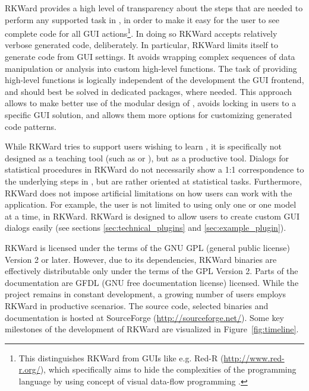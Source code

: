 RKWard provides a high level of transparency about the steps that are needed to
perform any supported task in , in order to make it easy for the user to see
complete code for all GUI actions\footnote{
  This distinguishes RKWard from  GUIs like e.g. Red-R (\url{http://www.red-r.org/}), which 
  specifically aims to hide the complexities of the  programming language by using concept of visual data-flow
  programming \citep{Sutherland1966}.
}. In doing so RKWard accepts relatively verbose
generated code, deliberately. In particular, RKWard limits itself to generate 
code from GUI settings. It avoids wrapping complex sequences of data
manipulation or analysis into custom high-level  functions. The task of
providing high-level functions is logically independent of the development the
GUI frontend, and should best be solved in dedicated  packages, where needed.
This approach allows to make better use of the modular design of , avoids
locking in users to a specific GUI solution, and allows them more options for
customizing generated code patterns.

While RKWard tries to support users wishing to learn , it is specifically not
designed as a teaching tool (such as  or ), but as
a productive tool. Dialogs for statistical procedures in RKWard do not
necessarily show a 1:1 correspondence to the underlying steps in , but are
rather oriented at statistical tasks. Furthermore, RKWard does not impose
artificial limitations on how users can work with the application. For example,
the user is not limited to using only one  or one model at a
time, in RKWard. RKWard is designed to allow users to create custom GUI dialogs
easily (see sections \ref{sec:technical_plugins} and \ref{sec:example_plugin}).

RKWard is licensed under the terms of the GNU GPL (general public license) Version 2
or later. However, due to its dependencies, RKWard binaries are effectively
distributable only under the terms of the GPL Version 2. Parts of the documentation are
GFDL (GNU free documentation license) licensed. While the project remains in constant development, a growing
number of users employs RKWard in productive scenarios. The source code,
selected binaries and documentation is hosted at SourceForge
(\url{http://sourceforge.net/}). Some key milestones of the development of RKWard are
visualized in Figure~\ref{fig:timeline}.

